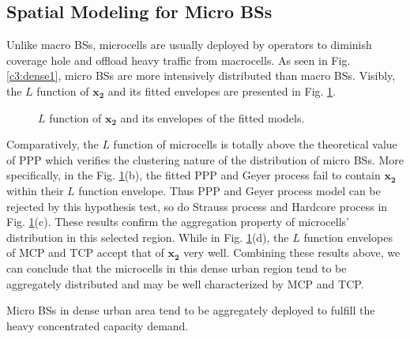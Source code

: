 \subsection*{Spatial Modeling for Micro BSs}
Unlike macro BSs, microcells are usually deployed by operators to diminish coverage hole and offload heavy traffic from macrocells. As seen in Fig. \ref{c3:dense1}, micro BSs are more intensively distributed than macro BSs. Visibly, the $L$ function of $\mathbf{x_2}$ and its fitted envelopes are presented in Fig. \ref{fig:micro_l}.

\begin{figure} [!htb]
\centering
 \hspace{1in}
\caption{$L$ function of $\mathbf{x_2}$ and its envelopes of the fitted models.}
\label{fig:micro_l}
\end{figure}


Comparatively, the $L$ function of microcells is totally above the theoretical value of PPP which verifies the clustering nature of the distribution of micro BSs. More specifically, in the Fig. \ref{fig:micro_l}(b), the fitted PPP and Geyer process fail to contain $\mathbf{x_2}$ within their $L$ function envelope. Thus PPP and Geyer process model can be rejected by this hypothesis test, so do Strauss process and Hardcore process in Fig. \ref{fig:micro_l}(c). These results confirm the aggregation property of microcells' distribution in this selected region. While in Fig. \ref{fig:micro_l}(d), the $L$ function envelopes of MCP and TCP accept that of $\mathbf{x_2}$ very well. Combining these results above, we can conclude that the microcells in this dense urban region tend to be aggregately distributed and may be well characterized by MCP and TCP.

\begin{remark}
Micro BSs in dense urban area tend to be aggregately deployed to fulfill the heavy concentrated capacity demand.
\end{remark}
